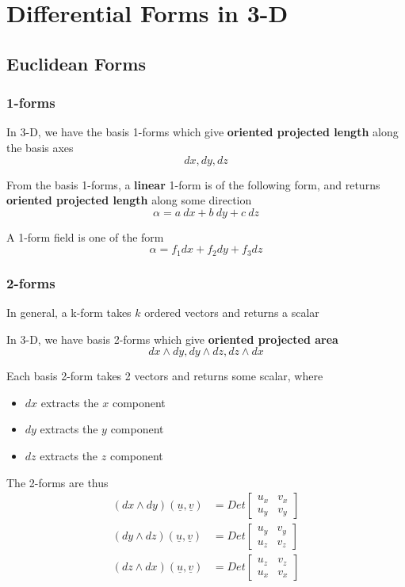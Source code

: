 \section{Differential Forms in 3-D}

\subsection{Euclidean Forms}

\subsubsection{1-forms}

In 3-D, we have the basis 1-forms which give \textbf{oriented projected length} along the basis axes
\[
  dx, dy, dz
\] 

From the basis 1-forms, a \textbf{linear} 1-form is of the following form, and returns \textbf{oriented projected length} along some direction
\[
  \alpha = a\ dx + b\ dy + c\ dz
\] 

A 1-form field is one of the form
\[
  \alpha = f_1 dx + f_2 dy + f_3 dz
\] 

\subsubsection{2-forms}

In general, a k-form takes $k$ ordered vectors and returns a scalar

In 3-D, we have basis 2-forms which give \textbf{oriented projected area} 
\[
  dx \wedge dy, dy \wedge dz, dz \wedge dx
\] 

Each basis 2-form takes 2 vectors and returns some scalar, where 
\begin{itemize}
   \item $dx$ extracts the $x$ component
   \item $dy$ extracts the $y$ component
   \item $dz$ extracts the $z$ component
\end{itemize}

The 2-forms are thus
\begin{align*}
   \left( dx \wedge dy \right) ( \underline{u}, \underline{v}) &= Det \begin{bmatrix} 
      u_x & v_x \\ u_y & v_y  
   \end{bmatrix} \\
   \left( dy \wedge dz \right) ( \underline{u}, \underline{v}) &= Det \begin{bmatrix} 
      u_y & v_y \\ u_z & v_z  
   \end{bmatrix} \\
   \left( dz \wedge dx \right) ( \underline{u}, \underline{v}) &= Det \begin{bmatrix} 
      u_z & v_z \\ u_x & v_x  
   \end{bmatrix}
\end{align*}


